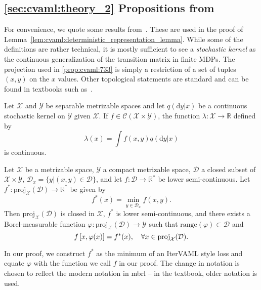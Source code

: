 \subsection{\autoref{sec:cvaml:theory_2} Propositions from \textcite{bertsekasshreve1978}}
\label{sec:cvaml:bertsekas}

For convenience, we quote some results from~\textcite{bertsekasshreve1978}.
These are used in the proof of Lemma~\ref{lem:cvaml:deterministic_representation_lemma}.
While some of the definitions are rather technical, it is mostly sufficient to see a \emph{stochastic kernel} as the continuous generalization of the transition matrix in finite MDPs.
The projection used in \autoref{prop:cvaml:733} is simply a restriction of a set of tuples $(x,y)$ on the $x$ values.
Other topological statements are standard and can be found in textbooks such as~\textcite{munkres2018}.


\begin{proposition}[Proposition~7.30]
\label{prop:cvaml:730}
    Let $\mathcal{X}$ and $\mathcal{Y}$ be separable metrizable spaces and let $q(\mathrm{d}y|x)$ be a continuous stochastic kernel on $\mathcal{Y}$ given $\mathcal{X}$. If $f\in\mathcal{C}(\mathcal{X}\times \mathcal{Y})$, the function $\lambda: \mathcal{X} \rightarrow \mathbb{R}$ defined by
    \[
        \lambda(x) = \int f(x,y) q(\mathrm{d}y|x)
    \]
    is continuous.
\end{proposition}

\newcommand{\proj}{\text{proj}}
\begin{proposition}[Proposition~7.33]
\label{prop:cvaml:733}
    Let $\mathcal{X}$ be a metrizable space, $\mathcal{Y}$ a compact metrizable space, $\mathcal{D}$ a closed subset of $\mathcal{X}\times\mathcal{Y}$, $\mathcal{D}_x = \{y | (x,y) \in \mathcal{D} \}$, and let $f:\mathcal{D}\rightarrow \mathbb{R}^*$ be lower semi-continuous.
    Let $f^*:\proj_\mathcal{X}(\mathcal{D}) \rightarrow \mathbb{R}^*$ be given by \[
    f^*(x) = \min_{y \in \mathcal{D}_x} f(x,y).
    \]
    Then $\proj_\mathcal{X}(\mathcal{D})$ is closed in $\mathcal{X}$, $f^*$ is lower semi-continuous, and there exists a Borel-measurable function $\varphi: \proj_\mathcal{X}(\mathcal{D}) \rightarrow \mathcal{Y}$ such that $\text{range}(\varphi) \subset \mathcal{D}$ and \[
    f\squareb{x, \varphi(x)} = f^*(x), \quad \forall x \in \proj_\mathcal{X}(\mathcal{D}).
    \]
\end{proposition}

In our proof, we construct $f^*$ as the minimum of an IterVAML style loss and equate $\varphi$ with the function we call $f$ in our proof.
The change in notation is chosen to reflect the modern notation in \ac{mbrl} -- in the textbook, older notation is used.
\label{app:cvaml:conjecture}
